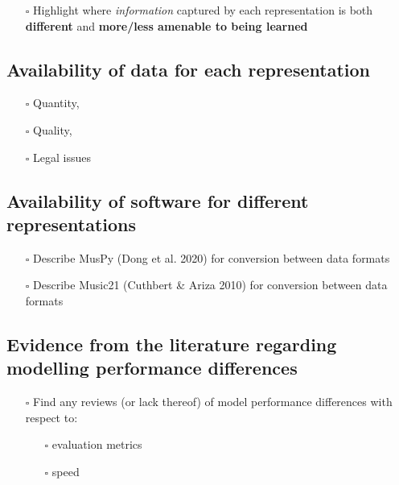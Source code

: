 \documentclass[12pt,a4paper,]{report}
\providecommand{\tightlist}{%
  \setlength{\itemsep}{0pt}\setlength{\parskip}{0pt}}
\begin{document}
\begin{itemize}
\tightlist
\item[$\square$]
  Highlight where \emph{information} captured by each representation is
  both \textbf{different} and \textbf{more/less amenable to being
  learned}
\end{itemize}

\hypertarget{availability-of-data-for-each-representation}{%
\subsection{Availability of data for each
representation}\label{availability-of-data-for-each-representation}}

\begin{itemize}
\tightlist
\item[$\square$]
  Quantity,
\item[$\square$]
  Quality,
\item[$\square$]
  Legal issues
\end{itemize}

\hypertarget{availability-of-software-for-different-representations}{%
\subsection{Availability of software for different
representations}\label{availability-of-software-for-different-representations}}

\begin{itemize}
\tightlist
\item[$\square$]
  Describe MusPy (Dong et al. 2020) for conversion between data formats
\item[$\square$]
  Describe Music21 (Cuthbert \& Ariza 2010) for conversion between data
  formats
\end{itemize}

\hypertarget{evidence-from-the-literature-regarding-modelling-performance-differences}{%
\subsection{Evidence from the literature regarding modelling performance
differences}\label{evidence-from-the-literature-regarding-modelling-performance-differences}}

\begin{itemize}
\tightlist
\item[$\square$]
  Find any reviews (or lack thereof) of model performance differences
  with respect to:

  \begin{itemize}
  \tightlist
  \item[$\square$]
    evaluation metrics
  \item[$\square$]
    speed
  \end{itemize}
\end{itemize}
\end{document}
